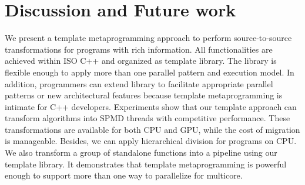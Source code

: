 \section{Discussion and Future work}\label{sec:con}


We present a template metaprogramming approach to perform source-to-source
transformations for programs with rich information. All functionalities
are achieved within ISO C++ and organized as template library. The
library is flexible enough to
apply more than one parallel
pattern and execution model. In addition, programmers can extend library to
facilitate appropriate parallel patterns or new architectural
features because template metaprogramming is
intimate for C++ developers.  Experiments show
that our template approach can transform algorithms into SPMD threads
with competitive performance. These transformations are available for
both CPU and GPU, while the cost of migration is manageable. Besides, we
can apply hierarchical division for programs on CPU. We also
transform a group of standalone functions into a
pipeline using our template library. It demonstrates that template
metaprogramming is powerful enough to support more than one way to
parallelize for multicore.



